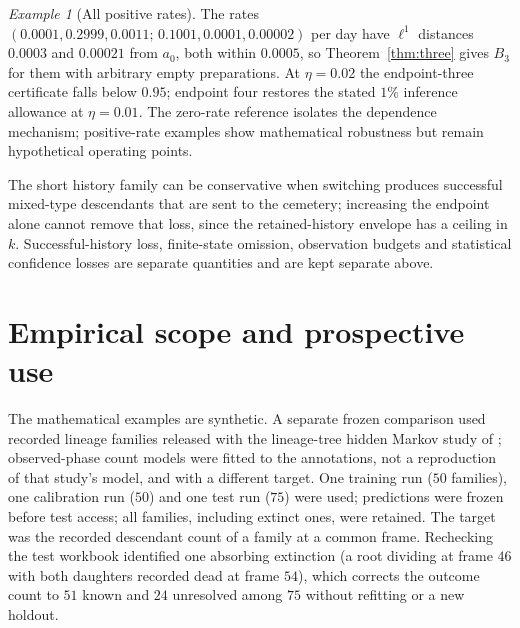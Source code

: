 \documentclass[11pt,a4paper]{article}
\theoremstyle{plain}
\theoremstyle{definition}
\theoremstyle{remark}
\newtheorem{example}[theorem]{Example}
\begin{document}
\begin{example}[All positive rates]
The rates $(0.0001,0.2999,0.0011;\,0.1001,0.0001,0.00002)$ per day have $\ell^1$ distances $0.0003$ and $0.00021$ from $a_0$, both within $0.0005$, so Theorem~\ref{thm:three} gives $B_3$ for them with arbitrary empty preparations. At $\eta=0.02$ the endpoint-three certificate falls below $0.95$; endpoint four restores the stated $1\%$ inference allowance at $\eta=0.01$. The zero-rate reference isolates the dependence mechanism; positive-rate examples show mathematical robustness but remain hypothetical operating points.
\end{example}

The short history family can be conservative when switching produces successful mixed-type descendants that are sent to the cemetery; increasing the endpoint alone cannot remove that loss, since the retained-history envelope has a ceiling in $k$. Successful-history loss, finite-state omission, observation budgets and statistical confidence losses are separate quantities and are kept separate above.

\section{Empirical scope and prospective use}\label{sec:empirical}

The mathematical examples are synthetic. A separate frozen comparison used recorded lineage families released with the lineage-tree hidden Markov study of \citet{mohammadi2022}; observed-phase count models were fitted to the annotations, not a reproduction of that study's model, and with a different target. One training run ($50$ families), one calibration run ($50$) and one test run ($75$) were used; predictions were frozen before test access; all families, including extinct ones, were retained. The target was the recorded descendant count of a family at a common frame. Rechecking the test workbook identified one absorbing extinction (a root dividing at frame $46$ with both daughters recorded dead at frame $54$), which corrects the outcome count to $51$ known and $24$ unresolved among $75$ without refitting or a new holdout.
\end{document}

